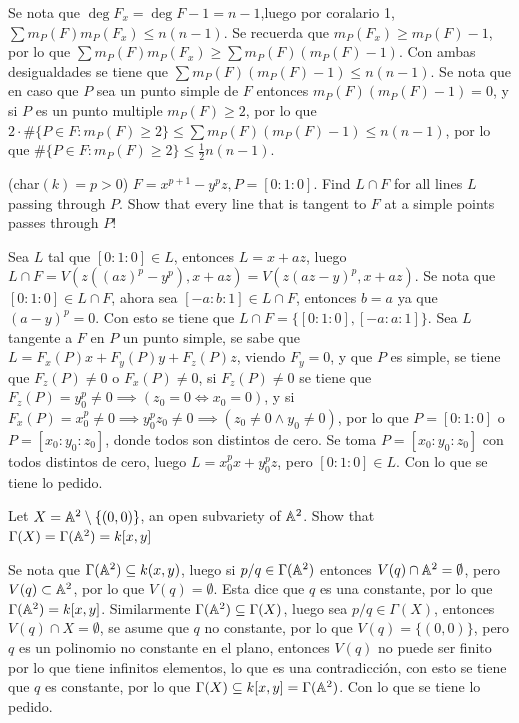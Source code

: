 \begin{sol}{5.22}
    Se nota que \(\deg F_x=\deg F-1=n-1\),luego por coralario 1, \(\sum m_P(F)m_P(F_x)\leq n(n-1)\). Se recuerda que \(m_P(F_x)\geq m_P(F)-1\), por lo que \(\sum m_P(F)m_P(F_x)\geq\sum m_P(F)(m_P(F)-1)\). Con ambas desigualdades se tiene que \(\sum m_P(F)(m_P(F)-1)\leq n(n-1)\). Se nota que en caso que \(P\) sea un punto simple de \(F\) entonces \(m_P(F)(m_P(F)-1)=0\), y si \(P\) es un punto multiple \(m_P(F)\geq2\), por lo que \(2\cdot\#\{P\in F:m_P(F)\geq2\}\leq\sum m_P(F)(m_P(F)-1)\leq n(n-1)\), por lo que \(\#\{P\in F:m_P(F)\geq2\}\leq\frac12n(n-1)\).
\end{sol}

\begin{prob}{5.28}
    (char\((k)=p>0\)) \(F=x^{p+1}-y^pz, P=[0:1:0]\). Find \(L\cap F\) for all lines \(L\) passing through \(P\). Show that every line that is tangent to \(F\) at a simple points passes through \(P\)!
\end{prob}

\begin{sol}{5.28}
    Sea \(L\) tal que \([0:1:0]\in L\), entonces \(L=x+az\), luego \(L\cap F=V(z((az)^p-y^p),x+az)=V(z(az-y)^p,x+az)\). Se nota que \([0:1:0]\in L\cap F\), ahora sea \([-a:b:1]\in L\cap F\), entonces \(b=a\) ya que \((a-y)^p=0\). Con esto se tiene que \(L\cap F=\{[0:1:0],[-a:a:1]\}\). Sea \(L\) tangente a \(F\) en \(P\) un punto simple, se sabe que \(L=F_x(P)x+F_y(P)y+F_z(P)z\), viendo \(F_y=0\), y que \(P\) es simple, se tiene que \(F_z(P)\neq0\) o \(F_x(P)\neq0\), si \(F_z(P)\neq0\) se tiene que \(F_z(P)=y_0^p\neq0\implies(z_0=0\iff x_0=0)\), y si \(F_x(P)=x_0^p\neq0\implies y_0^pz_0\neq0\implies(z_0\neq0\wedge y_0\neq0)\), por lo que \(P=[0:1:0]\) o \(P=[x_0:y_0:z_0]\), donde todos son distintos de cero. Se toma \(P=[x_0:y_0:z_0]\) con todos distintos de cero, luego \(L=x_0^px+y_0^pz\), pero \([0:1:0]\in L\). Con lo que se tiene lo pedido.
\end{sol}

\begin{prob}{6.9}
    Let \(X=\mathbb{A}^2\setminus\{(0,0)\}\), an open subvariety of \(\mathbb{A}^2\). Show that \(\Gamma(X)=\Gamma(\mathbb{A}^2)=k[x,y]\)
\end{prob}

\begin{sol}{6.9}
    Se nota que \(\Gamma(\mathbb{A}^2)\subseteq k(x,y)\), luego si \(p/q\in\Gamma(\mathbb{A}^2)\) entonces \(V(q)\cap\mathbb{A}^2=\emptyset\), pero \(V(q)\subset\mathbb{A}^2\), por lo que \(V(q)=\emptyset\). Esta dice que \(q\) es una constante, por lo que \(\Gamma(\mathbb{A}^2)=k[x,y]\). Similarmente \(\Gamma(\mathbb{A}^2)\subseteq\Gamma(X)\), luego sea \(p/q\in\Gamma(X)\), entonces \(V(q)\cap X=\emptyset\), se asume que \(q\) no constante, por lo que \(V(q)=\{(0,0)\}\), pero \(q\) es un polinomio no constante en el plano, entonces \(V(q)\) no puede ser finito por lo que tiene infinitos elementos, lo que es una contradicción, con esto se tiene que \(q\) es constante, por lo que \(\Gamma(X)\subseteq k[x,y]=\Gamma(\mathbb{A}^2)\). Con lo que se tiene lo pedido.
\end{sol}

